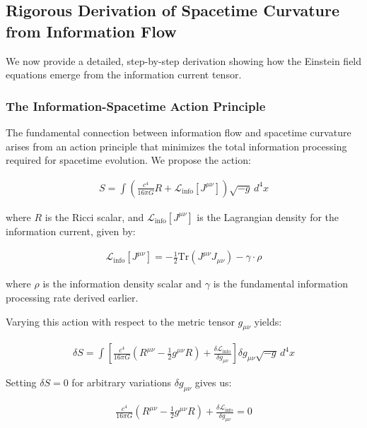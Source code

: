 \documentclass[11pt,english,twoside]{article}
\begin{document}
\subsection{Rigorous Derivation of Spacetime Curvature from Information Flow}

We now provide a detailed, step-by-step derivation showing how the Einstein field equations emerge from the information current tensor. 

\subsubsection{The Information-Spacetime Action Principle}

The fundamental connection between information flow and spacetime curvature arises from an action principle that minimizes the total information processing required for spacetime evolution. We propose the action:

\begin{align}
S = \int \left(\frac{c^4}{16\pi G}R + \mathcal{L}_{\text{info}}[J^{\mu\nu}]\right) \sqrt{-g} \, d^4x
\end{align}

where $R$ is the Ricci scalar, and $\mathcal{L}_{\text{info}}[J^{\mu\nu}]$ is the Lagrangian density for the information current, given by:

\begin{align}
\mathcal{L}_{\text{info}}[J^{\mu\nu}] = -\frac{1}{2}\text{Tr}(J^{\mu\nu}J_{\mu\nu}) - \gamma \cdot \rho
\end{align}

where $\rho$ is the information density scalar and $\gamma$ is the fundamental information processing rate derived earlier.

Varying this action with respect to the metric tensor $g_{\mu\nu}$ yields:

\begin{align}
\delta S = \int \left[\frac{c^4}{16\pi G}(R^{\mu\nu} - \frac{1}{2}g^{\mu\nu}R) + \frac{\delta \mathcal{L}_{\text{info}}}{\delta g_{\mu\nu}}\right] \delta g_{\mu\nu} \sqrt{-g} \, d^4x
\end{align}

Setting $\delta S = 0$ for arbitrary variations $\delta g_{\mu\nu}$ gives us:

\begin{align}
\frac{c^4}{16\pi G}(R^{\mu\nu} - \frac{1}{2}g^{\mu\nu}R) + \frac{\delta \mathcal{L}_{\text{info}}}{\delta g_{\mu\nu}} = 0
\end{align}
\end{document}

